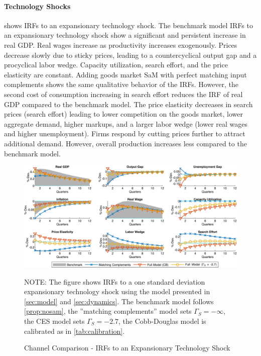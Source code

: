 \documentclass[12pt,3p,authoryear,review]{elsarticle}
\begin{document}
\paragraph{Technology Shocks}%
 shows IRFs to an expansionary technology shock. The benchmark model IRFs to an expansionary technology shock show a significant and persistent increase in real GDP. Real wages increase as productivity increases exogenously. Prices decrease slowly due to sticky prices, leading to a countercyclical output gap and a procyclical labor wedge. Capacity utilization, search effort, and the price elasticity are constant. Adding goods market SaM with perfect matching input complements shows the same qualitative behavior of the IRFs. However, the second cost of consumption increasing in search effort reduces the IRF of real GDP compared to the benchmark model. The price elasticity decreases in search prices (search effort) leading to lower competition on the goods market, lower aggregate demand, higher markups, and a larger labor wedge (lower real wages and higher unemployment). Firms respond by cutting prices further to attract additional demand. However, overall production increases less compared to the benchmark model.\\%
\begin{figure}[t]%
	\centering%
	\caption{Channel Comparison - IRFs to an Expansionary Technology Shock}\label{fig:irf_default_tfp}%
	\vspace{-0.1in}%
	\includegraphics[width=\textwidth]{fig_4_irf_default_tfp.png}%
	\vspace{-0.1in}%
	{\tiny \singlespacing NOTE: The figure shows IRFs to a one standard deviation expansionary technology shock using the model presented in \cref{sec:model} and \cref{sec:dynamics}. The benchmark model follows \cref{prop:nosam}, the ''matching complements'' model sets $\Gamma_S = -\infty$, the CES model sets $\Gamma_S = -2.7$, the Cobb-Douglas model is calibrated as in \cref{tab:calibration}.\par}%
\end{figure}%
\end{document}
